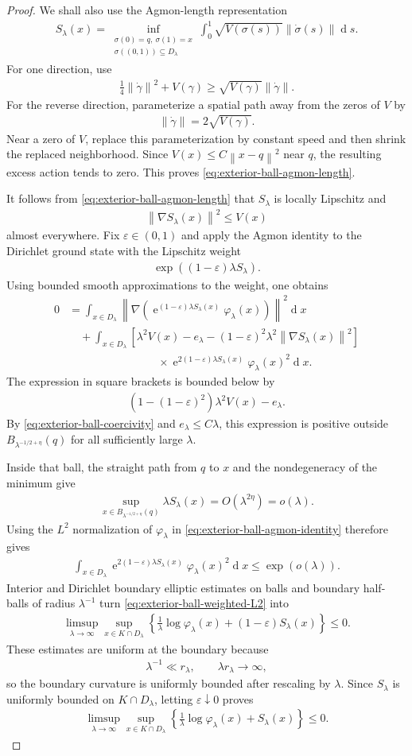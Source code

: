 \documentclass[a4paper,10pt]{article}
\numberwithin{equation}{section}
\theoremstyle{plain}
\theoremstyle{plain}
\theoremstyle{plain}
\theoremstyle{plain}
\theoremstyle{plain}
\theoremstyle{remark}
\theoremstyle{definition}
\newcommand{\ee}{\operatorname{e}}
\newcommand\norm[1]{\left\lVert#1\right\rVert}
\newcommand{\dif}{\operatorname{d}\!} %
\newcommand{\vf}{\varphi}
\newcommand{\eq}[1]{\begin{align*}#1\end{align*}}
\newcommand{\eql}[1]{\begin{align}#1\end{align}}
\newcommand{\br}[1]{\left(#1\right)}
\begin{document}
\begin{proof}
We shall also use the Agmon-length representation
\eql{
S_\lambda(x)
=
\inf_{\substack{
\sigma(0)=q,\ 
\sigma(1)=x\\
\sigma((0,1))
\subseteq
D_\lambda
}}
\int_0^1
\sqrt{
V\br{\sigma(s)}
}
\norm{\dot\sigma(s)}
\dif{s}.
\label{eq:exterior-ball-agmon-length}
}
For one direction, use
\eq{
\frac14
\norm{\dot\gamma}^2
+
V(\gamma)
\geq
\sqrt{V(\gamma)}
\norm{\dot\gamma}.
}
For the reverse direction, parameterize a spatial path away from the
zeros of $V$ by
\eq{
\norm{\dot\gamma}
=
2\sqrt{V(\gamma)}.
}
Near a zero of $V$, replace this parameterization by constant speed
and then shrink the replaced neighborhood. Since
$V(x)\leq C\norm{x-q}^2$ near $q$, the resulting excess action tends
to zero. This proves \cref{eq:exterior-ball-agmon-length}.

It follows from \cref{eq:exterior-ball-agmon-length} that $S_\lambda$
is locally Lipschitz and
\eq{
\norm{\nabla S_\lambda(x)}^2
\leq
V(x)
}
almost everywhere. Fix $\varepsilon\in(0,1)$ and apply the Agmon
identity to the Dirichlet ground state with the Lipschitz weight
\eq{
\exp\br{
(1-\varepsilon)
\lambda S_\lambda
}.
}
Using bounded smooth approximations to the weight, one obtains
\eql{
0
&=
\int_{x\in D_\lambda}
\norm{
\nabla\left(
\ee^{(1-\varepsilon)\lambda S_\lambda(x)}
\vf_\lambda(x)
\right)
}^2
\dif{x}
\nonumber\\
&\quad+
\int_{x\in D_\lambda}
\left[
\lambda^2V(x)
-
e_\lambda
-
(1-\varepsilon)^2
\lambda^2
\norm{\nabla S_\lambda(x)}^2
\right]
\nonumber\\
&\hspace{8em}\times
\ee^{2(1-\varepsilon)\lambda S_\lambda(x)}
\vf_\lambda(x)^2
\dif{x}.
\label{eq:exterior-ball-agmon-identity}
}
The expression in square brackets is bounded below by
\eq{
\br{
1-(1-\varepsilon)^2
}
\lambda^2V(x)
-
e_\lambda.
}
By \cref{eq:exterior-ball-coercivity} and $e_\lambda\leq C\lambda$,
this expression is positive outside
$B_{\lambda^{-1/2+\eta}}(q)$ for all sufficiently large $\lambda$.

Inside that ball, the straight path from $q$ to $x$ and the
nondegeneracy of the minimum give
\eq{
\sup_{
x\in
B_{\lambda^{-1/2+\eta}}(q)
}
\lambda S_\lambda(x)
=
O\br{\lambda^{2\eta}}
=
o(\lambda).
}
Using the $L^2$ normalization of $\vf_\lambda$ in
\cref{eq:exterior-ball-agmon-identity} therefore gives
\eql{
\int_{x\in D_\lambda}
\ee^{2(1-\varepsilon)\lambda S_\lambda(x)}
\vf_\lambda(x)^2
\dif{x}
\leq
\exp(o(\lambda)).
\label{eq:exterior-ball-weighted-L2}
}
Interior and Dirichlet boundary elliptic estimates on balls and
boundary half-balls of radius $\lambda^{-1}$ turn
\cref{eq:exterior-ball-weighted-L2} into
\eq{
\limsup_{\lambda\to\infty}
\sup_{x\in K\cap D_\lambda}
\left\{
\frac1\lambda
\log\vf_\lambda(x)
+
(1-\varepsilon)
S_\lambda(x)
\right\}
\leq0.
}
These estimates are uniform at the boundary because
\eq{
\lambda^{-1}
\ll
r_\lambda,
\qquad
\lambda r_\lambda
\longrightarrow
\infty,
}
so the boundary curvature is uniformly bounded after rescaling by
$\lambda$. Since $S_\lambda$ is uniformly bounded on
$K\cap D_\lambda$, letting $\varepsilon\downarrow0$ proves
\eq{
\limsup_{\lambda\to\infty}
\sup_{x\in K\cap D_\lambda}
\left\{
\frac1\lambda
\log\vf_\lambda(x)
+
S_\lambda(x)
\right\}
\leq0.
}


\end{proof}
\end{document}
